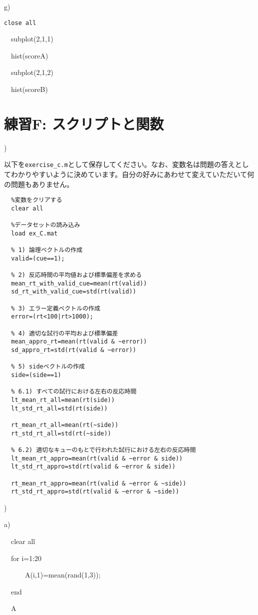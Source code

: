 \documentclass{jsarticle}
\begin{document}
g) {\tt close all

\ \ subplot(2,1,1)

\ \ hist(scoreA)

\ \ subplot(2,1,2)

\ \ hist(scoreB)
}

\section{練習F: スクリプトと関数}

)

\begin{screen}
以下を{\tt exercise\_c.m}として保存してください。なお、変数名は問題の答えとしてわかりやすいように決めています。自分の好みにあわせて変えていただいて何の問題もありません。
\end{screen}

\begin{verbatim}
  %変数をクリアする
  clear all

  %データセットの読み込み
  load ex_C.mat

  % 1) 論理ベクトルの作成
  valid=(cue==1);

  % 2) 反応時間の平均値および標準偏差を求める
  mean_rt_with_valid_cue=mean(rt(valid))
  sd_rt_with_valid_cue=std(rt(valid))

  % 3) エラー定義ベクトルの作成
  error=(rt<100|rt>1000);

  % 4) 適切な試行の平均および標準偏差
  mean_appro_rt=mean(rt(valid & ~error))
  sd_appro_rt=std(rt(valid & ~error))

  % 5) sideベクトルの作成
  side=(side==1)

  % 6.1) すべての試行における左右の反応時間
  lt_mean_rt_all=mean(rt(side))
  lt_std_rt_all=std(rt(side))

  rt_mean_rt_all=mean(rt(~side))
  rt_std_rt_all=std(rt(~side))

  % 6.2) 適切なキューのもとで行われた試行における左右の反応時間
  lt_mean_rt_appro=mean(rt(valid & ~error & side))
  lt_std_rt_appro=std(rt(valid & ~error & side))

  rt_mean_rt_appro=mean(rt(valid & ~error & ~side))
  rt_std_rt_appro=std(rt(valid & ~error & ~side))
\end{verbatim}

\bigskip

)

a) {\tt

\ \ clear all

\ \ for i=1:20

\ \ \ \ \ \ A(i,1)=mean(rand(1,3));

\ \ end

\ \ A
}
\end{document}
